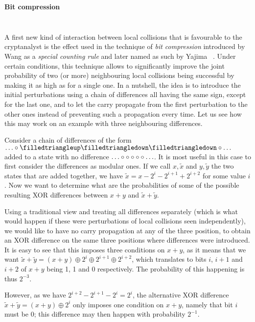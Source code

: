 \medskip

\paragraph{Bit compression}
$\phantom{bouh}$

\medskip

\noindent
A first new kind of interaction between local collisions that is favourable to the cryptanalyst is the effect used in the technique of \emph{bit compression} introduced by Wang \etal \cite{DBLP:conf/crypto/WangYY05a}
as a \emph{special counting rule} and later named as such by Yajima \etal~\cite{DBLP:conf/ccs/YajimaINSSKO08}. Under certain conditions, this technique allows to significantly
improve the joint probability of two (or more) neighbouring local collisions being successful by making it as high as for a single one. In a nutshell, the idea is to introduce the initial perturbations
using a chain of differences all
having the same sign, except for the last one, and to let the carry propagate from the first
perturbation to the other ones instead of preventing such a propagation every time.
Let us see how this may work on an example with three neighbouring differences.

\begin{example}
\label{ex:bit_comp}
Consider a chain of differences of the form $\ldots\mnodiff\monediffu\monediffd\monediffd\mnodiff\ldots$ added to a state with no difference $\ldots\circ\circ\circ\circ\circ\ldots$.
It is most useful in this case to first consider the differences as modular ones. If we call $x,\widetilde{x}$ and $y,\widetilde{y}$ the two states that are added together, we
have $\widetilde{x} = x - 2^{i} - 2^{i+1} + 2^{i+2}$ for some value $i$. Now we want to determine what are the probabilities of some of the possible resulting XOR differences between $x + y$ and $\widetilde{x} + \widetilde{y}$.

Using a traditional view and treating all differences separately (which is what would happen if these were perturbations of local collisions seen independently), we would like to have no
carry propagation at any of the three position, to obtain an XOR difference on the same three positions where differences were introduced. It is easy to see that this imposes three conditions
on $x + y$, as it means that we want $\widetilde{x} + \widetilde{y} = (x + y) \oplus 2^{i} \oplus 2^{i+1} \oplus 2^{i+2}$, which translates to bits $i$, $i+1$ and $i+2$ of $x+y$ being 1, 1 and 0 respectively.
The probability of this happening is thus $2^{-3}$.

However, as we have $2^{i+2} - 2^{i+1} - 2^{i} = 2^{i}$, the alternative XOR difference $\widetilde{x} + \widetilde{y} = (x + y) \oplus 2^{i}$ only imposes one condition on $x + y$, namely that bit $i$
must be 0; this difference may then happen with probability $2^{-1}$.
\end{example}

